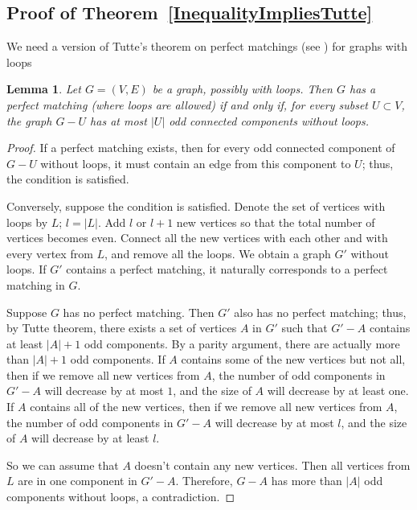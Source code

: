 \documentclass[12pt]{article}
\newtheorem{lemma}{Lemma}[section]
\theoremstyle{definition}
\theoremstyle{plain}
\begin{document}
\subsection{Proof of Theorem~\ref{InequalityImpliesTutte}}

We need a version of Tutte's theorem on perfect matchings (see \cite{T}) for graphs with loops

\begin{lemma}\label{TutteWithLoops}
Let $G=(V,E)$ be a graph, possibly with loops. Then $G$ has a perfect matching (where loops are allowed) if and only if, 
for every subset $U
\subset V$, the graph $G-U$ has at most
$|U|$  odd connected components without loops.
\end{lemma}


\begin{proof}
If a perfect matching exists, then for every odd connected component of $G-U$ without loops, it must contain an edge from
this component to $U$; thus, the condition is satisfied. 

Conversely, suppose the condition is satisfied. 
Denote the set of vertices with loops by $L$; $l=|L|$.
Add $l$ or $l+1$ new vertices so that the total number of vertices becomes even. Connect all the new vertices with each other and with every vertex from $L$, and remove all the loops. We obtain a graph $G'$ without loops. If $G'$ contains a perfect matching, it naturally corresponds to a perfect matching in $G$. 

Suppose $G$ has no perfect matching. Then $G'$ also has no perfect matching; thus, by Tutte theorem,  
there exists a set of vertices $A$ in $G'$
such that $G'-A$ contains at least $|A|+1$ odd components.
By a parity argument, there are actually more than $|A|+1$ odd components.
If $A$ contains some of the new vertices but not all, then if we remove all new vertices from $A$, the number of odd components in $G'-A$ will decrease by at most $1$, and the size of $A$ will decrease by at least one.
If $A$ contains all of the new vertices, then if we remove all new vertices from $A$, the number of odd components in $G'-A$ will decrease by at most $l$, and the size of $A$ will decrease by at least $l$. 

So we can assume that $A$ doesn't contain any new vertices. Then all vertices from $L$ are in one component in $G'-A$. Therefore, $G-A$ has more than $|A|$ odd components without loops, a contradiction.
\end{proof}
\end{document}
